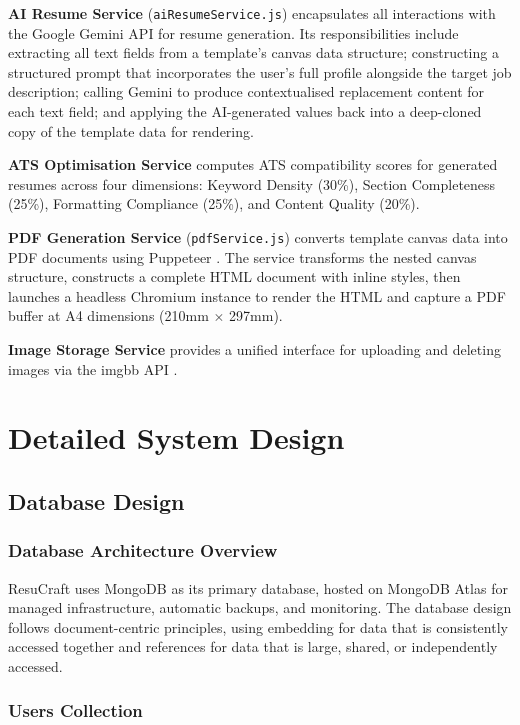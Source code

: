 \documentclass[12pt, a4paper, oneside]{report}
\begin{document}
\textbf{AI Resume Service} (\texttt{aiResumeService.js}) encapsulates all interactions with the Google Gemini API \cite{gemini2023} for resume generation. Its responsibilities include extracting all text fields from a template's canvas data structure; constructing a structured prompt that incorporates the user's full profile alongside the target job description; calling Gemini to produce contextualised replacement content for each text field; and applying the AI-generated values back into a deep-cloned copy of the template data for rendering.

\textbf{ATS Optimisation Service} computes ATS compatibility scores \cite{jobscan2021} for generated resumes across four dimensions: Keyword Density (30\%), Section Completeness (25\%), Formatting Compliance (25\%), and Content Quality (20\%).

\textbf{PDF Generation Service} (\texttt{pdfService.js}) converts template canvas data into PDF documents using Puppeteer \cite{puppeteer2024}. The service transforms the nested canvas structure, constructs a complete HTML document with inline styles, then launches a headless Chromium instance to render the HTML and capture a PDF buffer at A4 dimensions (210mm $\times$ 297mm).

\textbf{Image Storage Service} provides a unified interface for uploading and deleting images via the imgbb API \cite{imgbb2024}.

\section{Detailed System Design}

\subsection{Database Design}

\subsubsection{Database Architecture Overview}

ResuCraft uses MongoDB \cite{mongodb2024} as its primary database, hosted on MongoDB Atlas for managed infrastructure, automatic backups, and monitoring. The database design follows document-centric principles, using embedding for data that is consistently accessed together and references for data that is large, shared, or independently accessed.

\subsubsection{Users Collection}
\end{document}
